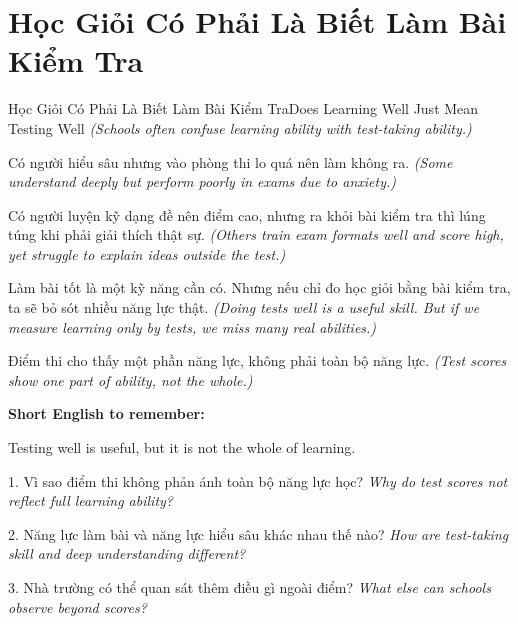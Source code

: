 \section{Học Giỏi Có Phải Là Biết Làm Bài Kiểm Tra}
\begin{truyen}{Học Giỏi Có Phải Là Biết Làm Bài Kiểm Tra}{Does Learning Well Just Mean Testing Well}
\textit{(Schools often confuse learning ability with test-taking ability.)}

Có người hiểu sâu nhưng vào phòng thi lo quá nên làm không ra.
\textit{(Some understand deeply but perform poorly in exams due to anxiety.)}

Có người luyện kỹ dạng đề nên điểm cao, nhưng ra khỏi bài kiểm tra thì lúng túng khi phải giải thích thật sự.
\textit{(Others train exam formats well and score high, yet struggle to explain ideas outside the test.)}

Làm bài tốt là một kỹ năng cần có. Nhưng nếu chỉ đo học giỏi bằng bài kiểm tra, ta sẽ bỏ sót nhiều năng lực thật.
\textit{(Doing tests well is a useful skill. But if we measure learning only by tests, we miss many real abilities.)}
\end{truyen}

\begin{baihoc}
Điểm thi cho thấy một phần năng lực, không phải toàn bộ năng lực.
\textit{(Test scores show one part of ability, not the whole.)}
\end{baihoc}

\begin{ghinhoanh}
\textbf{Short English to remember:}

Testing well is useful, but it is not the whole of learning.

\end{ghinhoanh}

\begin{tuhocnhanh}
1. Vì sao điểm thi không phản ánh toàn bộ năng lực học? \textit{Why do test scores not reflect full learning ability?}

2. Năng lực làm bài và năng lực hiểu sâu khác nhau thế nào? \textit{How are test-taking skill and deep understanding different?}

3. Nhà trường có thể quan sát thêm điều gì ngoài điểm? \textit{What else can schools observe beyond scores?}
\end{tuhocnhanh}
\ngancach

